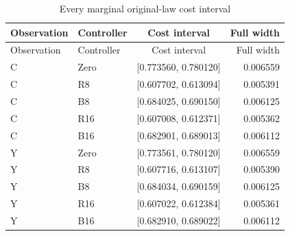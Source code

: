 {\small\setlength{\tabcolsep}{4pt}
\begin{longtable}{llcr}
\caption{Every marginal original-law cost interval}\label{tab:all-costs77}\\
\toprule
Observation & Controller & Cost interval & Full width \\
\midrule\endfirsthead
\toprule
Observation & Controller & Cost interval & Full width \\
\midrule\endhead
C & Zero & [0.773560, 0.780120] & 0.006559 \\
C & R8 & [0.607702, 0.613094] & 0.005391 \\
C & B8 & [0.684025, 0.690150] & 0.006125 \\
C & R16 & [0.607008, 0.612371] & 0.005362 \\
C & B16 & [0.682901, 0.689013] & 0.006112 \\
Y & Zero & [0.773561, 0.780120] & 0.006559 \\
Y & R8 & [0.607716, 0.613107] & 0.005390 \\
Y & B8 & [0.684034, 0.690159] & 0.006125 \\
Y & R16 & [0.607022, 0.612384] & 0.005361 \\
Y & B16 & [0.682910, 0.689022] & 0.006112 \\
\bottomrule\end{longtable}}
